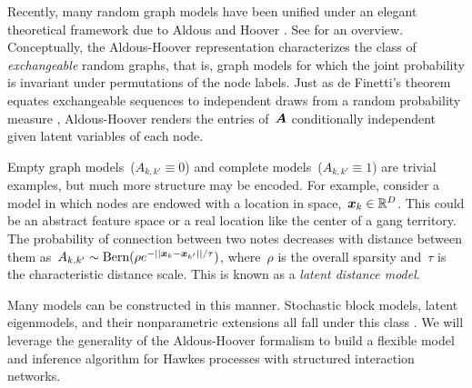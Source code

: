 Recently, many random graph models have been unified under an elegant theoretical framework due to Aldous and Hoover \cite{Aldous-1981,Hoover-1979}. See \citet{Lloyd-2012} for an overview. Conceptually, the Aldous-Hoover representation characterizes the class of \textit{exchangeable} random graphs, that is, graph models for which the joint probability is invariant under permutations of the node labels. Just as de Finetti's theorem equates exchangeable sequences to independent draws from a random probability measure
, Aldous-Hoover renders the entries of~$\boldsymbol{A}$ conditionally independent given latent variables of each node. 

Empty graph models~(${A_{k,k'}\equiv 0}$) and complete models~(${A_{k,k'}\equiv 1}$) are trivial examples, but much more structure may be encoded. For example, consider a model in which nodes are endowed with a location in space,~${\boldsymbol{x}_k\in\mathbb{R}^D}$. This could be an abstract feature space or a real location like the center of a gang territory. The probability of connection between two notes decreases with distance between them as~${A_{k,k'}\sim\text{Bern}(\rho e^{-||\boldsymbol{x}_k-\boldsymbol{x}_{k'}||/\tau})}$, where~$\rho$ is the overall sparsity and~$\tau$ is the characteristic distance scale.
This is known as a \emph{latent distance model}.

Many models can be constructed in this manner. Stochastic block models, latent eigenmodels, and their nonparametric extensions all fall under this class \cite{Lloyd-2012}. We will leverage the generality of the Aldous-Hoover formalism to build a flexible model and inference algorithm for Hawkes processes with structured interaction networks.

